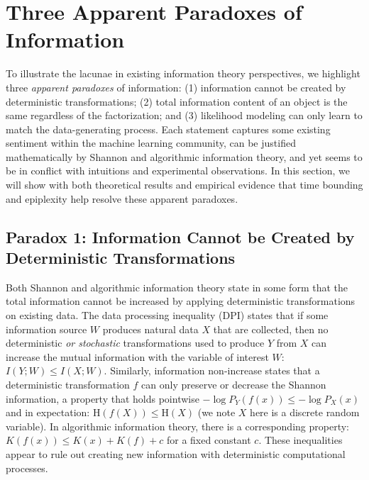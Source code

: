\documentclass[twoside]{article}
\newcommand{\rH}{\mathrm{H}}
\begin{document}
%

%

%

%
%
%




%
%
%
%
%
%


%
%
%

%


\section{Three Apparent Paradoxes of Information}
\label{sec:paradox}

To illustrate the lacunae in existing information theory perspectives, we highlight three \emph{apparent paradoxes} of information: (1) information cannot be created by deterministic transformations; (2) total information content of an object is the same regardless of the factorization;  and (3) likelihood modeling can only learn to match the data-generating process. %
Each statement captures some existing sentiment within the machine learning community, can be justified mathematically by Shannon and algorithmic information theory, and yet seems to be in conflict with intuitions and experimental observations. In this section, we will show with both theoretical results and empirical evidence that time bounding and epiplexity help resolve these apparent paradoxes.
%

%



%
%

%


\subsection{Paradox 1: Information Cannot be Created by Deterministic Transformations}
\label{sec:deterministic-info-creation}
%
Both Shannon and algorithmic information theory state in some form that the total information cannot be increased by applying deterministic transformations on existing data. The data processing inequality (DPI) states that if some information source $W$ produces natural data $X$ that are collected, then no deterministic \emph{or stochastic} transformations used to produce $Y$ from $X$ can increase the mutual information with the variable of interest $W$: $I(Y;W) \le I(X;W)$. Similarly, information non-increase states that a deterministic transformation $f$ can only preserve or decrease the Shannon information, a property that holds pointwise $-\log P_Y(f(x)) \le -\log P_X(x)$ and in expectation: $\rH(f(X)) \le \rH(X)$ (we note $X$ here is a discrete random variable). In algorithmic information theory, there is a corresponding property: $K(f(x)) \le K(x)+K(f)+c$ for a fixed constant $c$. These inequalities appear to rule out creating new information with deterministic computational processes.
\end{document}
